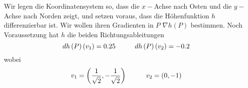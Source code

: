 \begin{enumerate}
Wir legen die Koordinatensystem so, dass die $x-$Achse nach Osten und die $y-$Achse nach Norden zeigt, und setzen voraus, dass die Höhenfunktion $h$ differenzierbar ist. Wir wollen ihren Gradienten in $P$ $\nabla h(P)$ bestimmen. Noch Voraussetzung hat $h$ die beiden Richtungsableitungen $$dh\left( P\right)\left( v_1\right)=0.25\hspace{10mm}dh\left( P\right)\left(  v_2\right)=-0.2$$ wobei $$v_1=\left( \frac{1}{\sqrt{2}},-\frac{1}{\sqrt{2}}\right)\hspace{10mm}v_2=(0,-1)$$
\end{enumerate}
